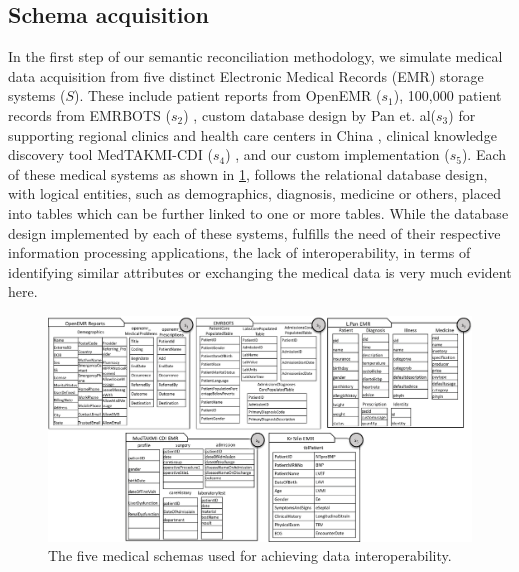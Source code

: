 \documentclass{ieeeaccess}
\begin{document}
\subsection{Schema acquisition}
\label{schema_acq}
In the first step of our semantic reconciliation methodology, we simulate medical data acquisition from five distinct Electronic Medical Records (EMR) storage systems ($S$). These include patient reports from OpenEMR ($s_1$), 100,000 patient records from EMRBOTS ($s_2$) \cite{kartoun2016methodology}, custom database design by Pan et. al($s_3$) for supporting regional clinics and health care centers in China \cite{pan2016design}, clinical knowledge discovery tool MedTAKMI-CDI ($s_4$) \cite{inokuchi2007medtakmi}, and our custom implementation ($s_5$). Each of these medical systems as shown in \ref{fig:schema}, follows the relational database design, with logical entities, such as demographics, diagnosis, medicine or others, placed into tables which can be further linked to one or more tables. While the database design implemented by each of these systems, fulfills the need of their respective information processing applications, the lack of interoperability, in terms of identifying similar attributes or exchanging the medical data is very much evident here. 

\begin{figure}[t!]
	\centering
	\includegraphics[scale=0.53]{schemas}
	\caption{The five medical schemas used for achieving data interoperability.}
	\label{fig:schema}
\end{figure}
\end{document}
